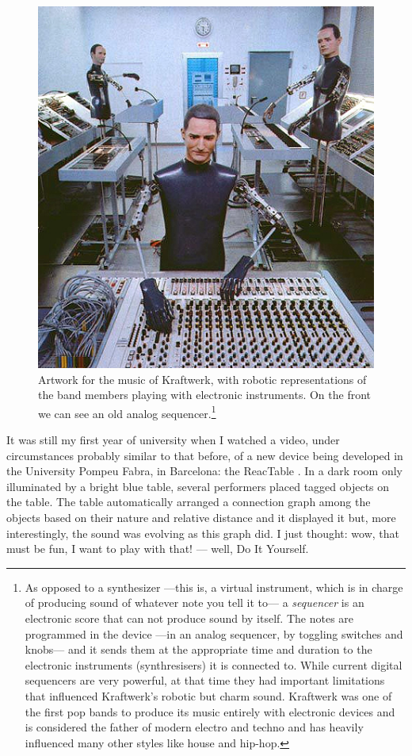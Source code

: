 \begin{figure}[h!]
  \begin{minipage}{\textwidth}
    \centering
  \includegraphics[width=.6\textwidth]{pic/kraftwerk.jpg}
  \caption[Artwork for the music of Kraftwerk]{Artwork for the music
    of Kraftwerk, with robotic representations of the band members
    playing with electronic instruments. On the front we can see an
    old analog sequencer.\footnote{As opposed to a synthesizer ---this is, a
    virtual instrument, which is in charge of producing sound of
    whatever note you tell it to--- a \emph{sequencer} is an
    electronic score that can not produce sound by itself. The notes
    are programmed in the device ---in an analog sequencer, by
    toggling switches and knobs--- and it sends them at the
    appropriate time and duration to the electronic instruments
    (synthresisers) it is connected to. While current digital
    sequencers are very powerful, at that time they had important
    limitations that influenced Kraftwerk's robotic but charm
    sound. Kraftwerk was one of the first pop bands to produce its
    music entirely with electronic devices and is considered the
    father of modern electro and techno and has heavily influenced
    many other styles like house and hip-hop.}}
  \end{minipage}
\end{figure}

It was still my first year of university when I watched a video, under
circumstances probably similar to that before, of a new device being
developed in the University Pompeu Fabra, in Barcelona: the ReacTable
\cite{jorda07thereactable}. In a dark room only illuminated by a
bright blue table, several performers placed tagged objects on the
table. The table automatically arranged a connection graph among the
objects based on their nature and relative distance and it displayed
it but, more interestingly, the sound was evolving as this graph
did. I just thought: wow, that must be fun, I want to play with that!
--- well, Do It Yourself.

